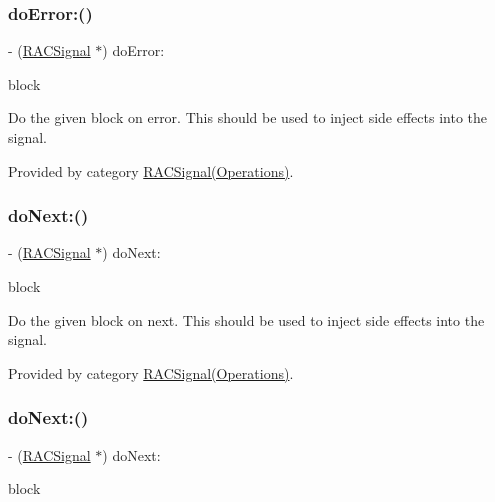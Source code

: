 \subsubsection{\texorpdfstring{do\+Error\+:()}{doError:()}\hspace{0.1cm}{\footnotesize\ttfamily [3/3]}}
{\footnotesize\ttfamily -\/ (\mbox{\hyperlink{interface_r_a_c_signal}{R\+A\+C\+Signal}} $\ast$) do\+Error\+: \begin{DoxyParamCaption}\item[{(void($^\wedge$)(N\+S\+Error $\ast$error))}]{block }\end{DoxyParamCaption}}

Do the given block on {\ttfamily error}. This should be used to inject side effects into the signal. 

Provided by category \mbox{\hyperlink{category_r_a_c_signal_07_operations_08_ac97a1fc7c03123a75746f2602b7444b4}{R\+A\+C\+Signal(\+Operations)}}.

\mbox{\label{interface_r_a_c_signal_a36028c2d987159f5210840358f4877c9}} 
\subsubsection{\texorpdfstring{do\+Next\+:()}{doNext:()}\hspace{0.1cm}{\footnotesize\ttfamily [1/3]}}
{\footnotesize\ttfamily -\/ (\mbox{\hyperlink{interface_r_a_c_signal}{R\+A\+C\+Signal}} $\ast$) do\+Next\+: \begin{DoxyParamCaption}\item[{(void($^\wedge$)(id x))}]{block }\end{DoxyParamCaption}}

Do the given block on {\ttfamily next}. This should be used to inject side effects into the signal. 

Provided by category \mbox{\hyperlink{category_r_a_c_signal_07_operations_08_a36028c2d987159f5210840358f4877c9}{R\+A\+C\+Signal(\+Operations)}}.

\mbox{\label{interface_r_a_c_signal_a36028c2d987159f5210840358f4877c9}} 
\subsubsection{\texorpdfstring{do\+Next\+:()}{doNext:()}\hspace{0.1cm}{\footnotesize\ttfamily [2/3]}}
{\footnotesize\ttfamily -\/ (\mbox{\hyperlink{interface_r_a_c_signal}{R\+A\+C\+Signal}} $\ast$) do\+Next\+: \begin{DoxyParamCaption}\item[{(void($^\wedge$)(id x))}]{block }\end{DoxyParamCaption}}

